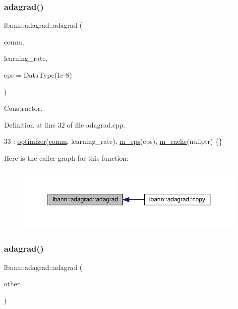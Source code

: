 \subsubsection{\texorpdfstring{adagrad()}{adagrad()}\hspace{0.1cm}{\footnotesize\ttfamily [1/2]}}
{\footnotesize\ttfamily lbann\+::adagrad\+::adagrad (\begin{DoxyParamCaption}\item[{\hyperlink{classlbann_1_1lbann__comm}{lbann\+\_\+comm} $\ast$}]{comm,  }\item[{Data\+Type}]{learning\+\_\+rate,  }\item[{Data\+Type}]{eps = {\ttfamily DataType(1e-\/8)} }\end{DoxyParamCaption})}

Constructor. 

Definition at line 32 of file adagrad.\+cpp.


\begin{DoxyCode}
33   : \hyperlink{classlbann_1_1optimizer_a136ed79c3f279ecded5be380fb67b05f}{optimizer}(\hyperlink{file__io_8cpp_ab048c6f9fcbcfaa57ce68b00263dbebe}{comm}, learning\_rate), \hyperlink{classlbann_1_1adagrad_aace057f88a46dab327f6409716dbe8de}{m\_eps}(eps), \hyperlink{classlbann_1_1adagrad_a5eaf0d220d2be78d91455ba85eef3e9a}{m\_cache}(\textcolor{keyword}{nullptr}) \{\}
\end{DoxyCode}
Here is the caller graph for this function\+:\nopagebreak
\begin{figure}[H]
\begin{center}
\leavevmode
\includegraphics[width=350pt]{classlbann_1_1adagrad_a26d826ba89053481a26573a592ff2f8a_icgraph}
\end{center}
\end{figure}
\mbox{\label{classlbann_1_1adagrad_aee9814a21ad8c44b402c77f244235597}} 
\subsubsection{\texorpdfstring{adagrad()}{adagrad()}\hspace{0.1cm}{\footnotesize\ttfamily [2/2]}}
{\footnotesize\ttfamily lbann\+::adagrad\+::adagrad (\begin{DoxyParamCaption}\item[{const \hyperlink{classlbann_1_1adagrad}{adagrad} \&}]{other }\end{DoxyParamCaption})}

